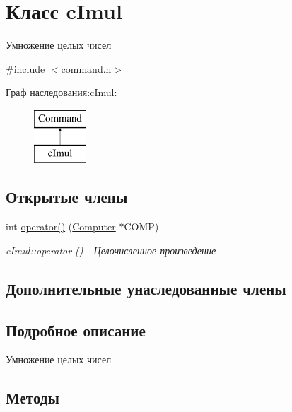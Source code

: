 \hypertarget{classc_imul}{}\section{Класс c\+Imul}
\label{classc_imul}


Умножение целых чисел  




{\ttfamily \#include $<$command.\+h$>$}

Граф наследования\+:c\+Imul\+:\begin{figure}[H]
\begin{center}
\leavevmode
\includegraphics[height=2.000000cm]{classc_imul}
\end{center}
\end{figure}
\subsection*{Открытые члены}
\begin{DoxyCompactItemize}
\item 
int \hyperlink{classc_imul_a2bdd2bb819f2a86d34de28a4c0764398}{operator()} (\hyperlink{class_computer}{Computer} $\ast$C\+O\+MP)
\begin{DoxyCompactList}\small\item\em c\+Imul\+::operator () -\/ Целочисленное произведение \end{DoxyCompactList}\end{DoxyCompactItemize}
\subsection*{Дополнительные унаследованные члены}


\subsection{Подробное описание}
Умножение целых чисел 

\subsection{Методы}
\hypertarget{classc_imul_a2bdd2bb819f2a86d34de28a4c0764398}{}\label{classc_imul_a2bdd2bb819f2a86d34de28a4c0764398} 
